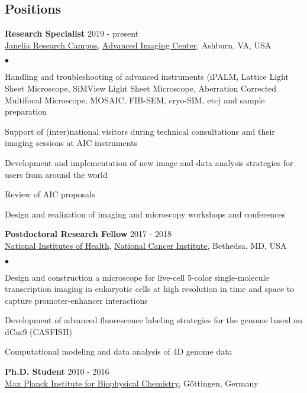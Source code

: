 \documentclass[margin,line]{res}
\newenvironment{list2}{
  \begin{list}{$\bullet$}{%
      \setlength{\itemsep}{0in}
      \setlength{\parsep}{0in} \setlength{\parskip}{0in}
      \setlength{\topsep}{0in} \setlength{\partopsep}{0in} 
      \setlength{\leftmargin}{0.2in}}}{\end{list}}
\begin{document}
\begin{resume}
\section{\sc Positions}
{\bf Research Specialist} \hfill {2019 - present}\\
\href{https://www.janelia.org/}{Janelia Research Campus}, \href{https://www.aicjanelia.org/}{Advanced Imaging Center}, Ashburn, VA, USA\\
 \vspace*{-1mm}
\begin{list2}
\vspace*{-1mm}
\item Handling and troubleshooting of  advanced instruments (iPALM, Lattice Light Sheet Microscope, SiMView Light Sheet Microscope, Aberration Corrected Multifocal Microscope, MOSAIC, FIB-SEM, cryo-SIM, etc) and sample preparation
\item Support of (inter)national visitors during technical consultations and  their imaging sessions at AIC instruments
\item Development and implementation of  new image and data analysis strategies for users from around the world
\item Review of AIC proposals
\item Design and realization of imaging and microscopy workshops and conferences
\end{list2}
{\bf Postdoctoral Research Fellow} \hfill {2017 - 2018}\\
\href{https://www.nih.gov/}{National Institutes of Health}, \href{https://www.cancer.gov/}{National Cancer Institute}, Bethedsa, MD, USA\\
\vspace*{-1mm}
\begin{list2}
\vspace*{-1mm}
\item Design and construction a microscope for live-cell 5-color single-molecule transcription imaging in eukaryotic cells at high resolution in time and space to capture promoter-enhancer interactions 
\item Development of advanced fluorescence labeling strategies for the genome based on dCas9 (CASFISH)
\item Computational modeling and data analysis of 4D genome data
\end{list2}
{\bf Ph.D. Student} \hfill {2010 - 2016}\\
\href{https://www.mpibpc.mpg.de/en}{Max Planck Institute for Biophysical Chemistry}, Göttingen, Germany\\

\end{resume}
\end{document}
